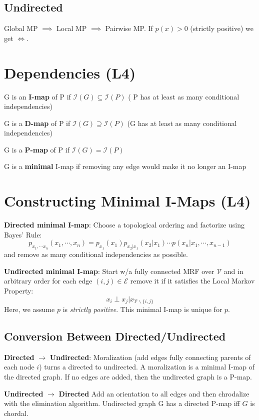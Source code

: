\documentclass[9pt]{article}
\begin{document}
\begin{multicols}{2}
\subsection{Undirected}
Global MP $\implies $ Local MP $\implies$
Pairwise MP. If $p(x) > 0$ (strictly positive) we get
$\Leftrightarrow$.
\section{Dependencies (L4)}
G is an \textbf{I-map} of P if $\mathcal{I}(G) \subseteq \mathcal{I}(P)$ (
P has at least as many conditional independencies)

G is a \textbf{D-map} of P if $\mathcal{I}(G) \supseteq \mathcal{I}(P)$ (G has
at least as many conditional independencies)

G is a \textbf{P-map} of P if $\mathcal{I}(G) = \mathcal{I}(P)$

G is a \textbf{minimal} I-map if removing any edge would make it no longer an I-map

\section{Constructing Minimal I-Maps (L4)}

\textbf{Directed minimal I-map}: Choose a topological ordering and factorize
using Bayes' Rule: $$p_{x_1,\cdots x_n}(x_1,\cdots,x_n)=p_{x_1}(x_1)p_{x_2|x_1}(x_2|x_1) \cdots p(x_n|x_1,\cdots,x_{n-1})$$ and remove as many conditional 
independencies as possible. 

\textbf{Undirected minimal I-map}: Start w/a fully connected MRF over 
$\mathcal{V}$ and in arbitrary order for each edge $(i,j) \in \mathcal{E}$ 
remove it if it satisfies the Local Markov Property: $$x_i \perp x_j | x_{\mathcal{V}\backslash \{i,j\}}$$ Here, we assume $p$ is \textit{strictly
positive}. This minimal I-map is unique for $p$. 

\subsection{Conversion Between Directed/Undirected}

\textbf{Directed} $\to$ \textbf{Undirected}:
Moralization (add edges fully connecting parents of each node $i$) turns a
directed to undirected. A moralization is a minimal I-map of the directed graph. If no edges are added, then the undirected graph is a P-map. 

\textbf{Undirected} $\to$ \textbf{Directed} Add an orientation
to all edges and then chrodalize with the elimination algorithm. 
Undirected graph G has a directed P-map iff $G$ is chordal. 


\end{multicols}
\end{document}
